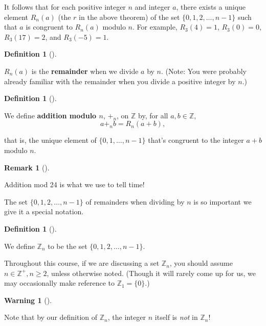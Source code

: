 \documentclass[10pt,]{book}
\newcommand{\terminology}[1]{\textbf{#1}}
\theoremstyle{plain}
\theoremstyle{definition}
\newtheorem{definition}[theorem]{Definition}
\theoremstyle{definition}
\newtheorem{remark}[theorem]{Remark}
\newtheorem{warning}[theorem]{Warning}
\theoremstyle{definition}
\theoremstyle{definition}
\numberwithin{equation}{section}
\def\Z{\mathbb{Z}}
\begin{document}
    It follows that for each positive integer \(n\) and integer \(a\),
    there exists a unique element \(R_n(a)\) (the \(r\) in the above
    theorem) of the set \(\{0,1,2,\ldots, n-1\}\) such that \(a\) is
    congruent to \(R_n(a)\) modulo \(n\). For example, \(R_3(4)=1\), \(R_3(0)=0\),
    \(R_3(17)=2\), and \(R_3(-5)=1\).
\begin{definition}[{}]\label{definition-23}

        \(R_n(a)\) is the \terminology{remainder} when we divide \(a\) by \(n\). (Note: You were probably already familiar with the remainder when you divide a positive integer by \(n\).)
\label{notation-41}
\end{definition}
\begin{definition}[{}]\label{definition-24}

        We define \terminology{addition modulo \(n\)}, \(+_n\), on \(\Z\) by,
        for all \(a,b\in \Z\),
\begin{equation*}

          a+_n b=R_n(a+b),
        
\end{equation*}

        that is, the unique element of \(\{0,1,\ldots, n-1\}\) that's congruent to the integer \(a+b\) modulo \(n\).
\label{notation-42}
\end{definition}
\begin{remark}[]\label{remark-13}

      Addition mod 24 is what we use to tell
      time!
\end{remark}
\par

    The set \(\{0,1,2,\ldots, n-1\}\) of remainders when dividing by \(n\) is so important we give it a
    special notation.
\begin{definition}[{}]\label{definition-25}

    We define \(\Z_n\) to be the set \(\{0,1,2,\ldots,n-1\}\).
\end{definition}
\par

    Throughout this course, if we are discussing a set \(\Z_n\), you
    should assume \(n\in \Z^+, n\geq 2\), unless otherwise noted.
    (Though it will rarely come up for us, we may occasionally make
    reference to \(\Z_1=\{0\}\).)
\begin{warning}[]\label{warning-10}

      Note that by our definition of \(\Z_n\), the
      integer \(n\) itself is \emph{not} in \(\Z_n\)!
\end{warning}
\par
\end{document}
